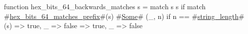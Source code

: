 function hex_bits_64_backwards_matches s = match s {
  s if match #\hyperref[sailRISCVzhexzybitszy64zymatcheszyprefix]{hex\_bits\_64\_matches\_prefix}#(s) {
    #\hyperref[sailRISCVzSome]{Some}# (_, n) if n == #\hyperref[sailRISCVzstringzylength]{string\_length}#(s) => true,
    _ => false
  } => true,
  _ => false
}
